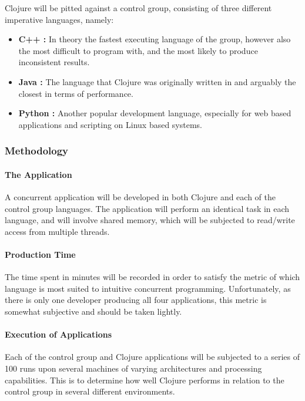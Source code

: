 \documentclass[12pt,a4paper]{article}
\begin{document}
Clojure will be pitted against a control group, consisting of three different imperative languages, namely:

\begin{itemize} \itemsep0pt
        \item \textbf{C++ :} In theory the fastest executing language of the group, however also the most difficult to program with, and the most likely to produce inconsistent results.
        \item \textbf{Java :} The language that Clojure was originally written in and arguably the closest in terms of performance.
        \item \textbf{Python :} Another popular development language, especially for web based applications and scripting on Linux based systems.
\end{itemize}

\subsubsection{Methodology}

\paragraph{The Application}
A concurrent application will be developed in both Clojure and each of the control group languages. The application will perform an identical task in each language, and will involve shared memory, which will be subjected to read/write access from multiple threads.

\paragraph{Production Time}

The time spent in minutes will be recorded in order to satisfy the metric of which language is most suited to intuitive concurrent programming. Unfortunately, as there is only one developer producing all four applications, this metric is somewhat subjective and should be taken lightly. 

\paragraph{Execution of Applications}
Each of the control group and Clojure applications will be subjected to a series of 100 runs upon several machines of varying architectures and processing capabilities. This is to determine how well Clojure performs in relation to the control group in several different environments. 
\end{document}
